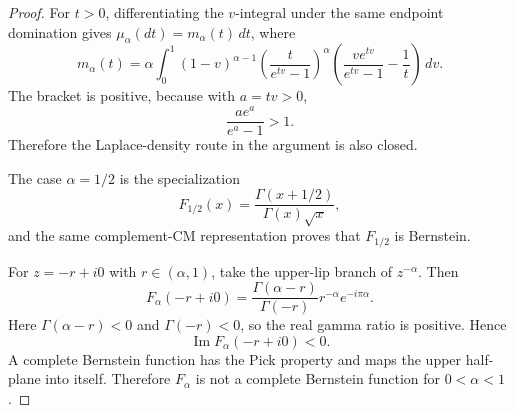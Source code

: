 \begin{proof}
For \(t>0\), differentiating the \(v\)-integral under the same endpoint domination gives \(\mu_\alpha(dt)=m_\alpha(t)\,dt\), where
\[
m_\alpha(t)
=
\alpha\int_0^1
(1-v)^{\alpha-1}
\left(\frac{t}{e^{tv}-1}\right)^\alpha
\left(
\frac{v e^{tv}}{e^{tv}-1}-\frac1t
\right)\,dv.
\]
The bracket is positive, because with \(a=tv>0\),
\[
\frac{a e^a}{e^a-1}>1.
\]
Therefore the Laplace-density route in the argument is also closed.

The case \(\alpha=1/2\) is the specialization
\[
F_{1/2}(x)=\frac{\Gamma(x+1/2)}{\Gamma(x)\sqrt{x}},
\]
and the same complement-CM representation proves that \(F_{1/2}\) is Bernstein.

For \(z=-r+i0\) with \(r\in(\alpha,1)\), take the upper-lip branch of \(z^{-\alpha}\). Then
\[
F_\alpha(-r+i0)
=
\frac{\Gamma(\alpha-r)}{\Gamma(-r)}r^{-\alpha}e^{-i\pi\alpha}.
\]
Here \(\Gamma(\alpha-r)<0\) and \(\Gamma(-r)<0\), so the real gamma ratio is positive. Hence
\[
\operatorname{Im} F_\alpha(-r+i0)<0.
\]
A complete Bernstein function has the Pick property and maps the upper half-plane into itself. Therefore \(F_\alpha\) is not a complete Bernstein function for \(0<\alpha<1\).
\end{proof}

